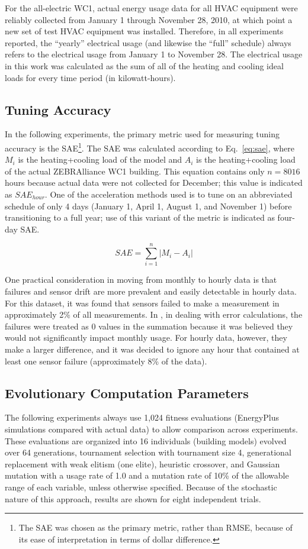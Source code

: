 \documentclass[preprint, review, 12pt]{elsarticle}
\begin{document}
For the all-electric WC1, actual energy usage data for all HVAC equipment were reliably collected from January 1 through November 28, 2010, at which point a new set of test HVAC equipment was installed. Therefore, in all experiments reported, the ``yearly'' electrical usage (and likewise the ``full'' schedule) always refers to the electrical usage from January 1 to November 28. The electrical usage in this work was calculated as the sum of all of the heating and cooling ideal loads for every time period (in kilowatt-hours).

\subsection{Tuning Accuracy}
In the following experiments, the primary metric used for measuring tuning accuracy is the SAE\footnote{The SAE was chosen as the primary metric, rather than RMSE, because of its ease of interpretation in terms of dollar difference.}. The SAE was calculated according to Eq.~\ref{eq:sae}, where $M_i$ is the heating+cooling load of the model and $A_i$ is the heating+cooling load of the actual ZEBRAlliance WC1 building. This equation contains only  $n=8016$ hours because actual data were not collected for December; this value is indicated as $SAE_{hour}$. One of the acceleration methods used is to tune on an abbreviated schedule of only 4 days (January 1, April 1, August 1, and November 1) before transitioning to a full year; use of this variant of the metric is indicated as four-day SAE.

\begin{equation}
\label{eq:sae}
	SAE = \sum_{i=1}^{n}\left|M_i - A_i\right|
\end{equation}

One practical consideration in moving from monthly to hourly data is that failures and sensor drift are more prevalent and easily detectable in hourly data. For this dataset, it was found that sensors failed to make a measurement in approximately 2\% of all measurements. In \cite{cit:garrett2013}, in dealing with error calculations, the failures were treated as 0 values in the summation because it was believed they would not significantly impact monthly usage. For hourly data, however, they make a larger difference, and it was decided to ignore any hour that contained at least one sensor failure (approximately 8\% of the data).

\subsection{Evolutionary Computation Parameters}
The following experiments always use 1,024 fitness evaluations (EnergyPlus simulations compared with actual data) to allow comparison across experiments. These evaluations are organized into 16 individuals (building models) evolved over 64 generations, tournament selection with tournament size 4, generational replacement with weak elitism (one elite), heuristic crossover, and Gaussian mutation with a usage rate of 1.0 and a mutation rate of 10\% of the allowable range of each variable, unless otherwise specified. Because of the stochastic nature of this approach, results are shown for eight independent trials.
\end{document}
